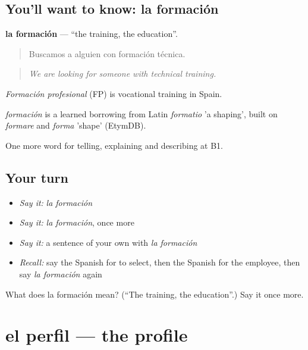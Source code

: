 \subsection*{You'll want to know: la formación}
\textbf{la formación} — \textquotedblleft{}the training, the education\textquotedblright{}.

\begin{quote}
Buscamos a alguien con formación técnica.
\end{quote}

\begin{quote}
\emph{We are looking for someone with technical training.}
\end{quote}

\emph{Formación profesional} (FP) is vocational training in Spain.

\begin{cousinweb}
\emph{formación} is a learned borrowing from Latin \emph{formatio} 'a shaping', built on \emph{formare} and \emph{forma} 'shape' (EtymDB).
\end{cousinweb}

\begin{grammarlens}[title={What you've built}]
One more word for telling, explaining and describing at B1.
\end{grammarlens}

\subsection*{Your turn}
\begin{itemize}
\raggedright
  \item \emph{Say it:} \emph{la formación}
  \item \emph{Say it:} \emph{la formación}, once more
  \item \emph{Say it:} a sentence of your own with \emph{la formación}
  \item \emph{Recall:} say the Spanish for to select, then the Spanish for the employee, then say \emph{la formación} again
\end{itemize}

\begin{tcolorbox}[breakable,colback=teal!4,colframe=teal!35!black,title={Before you move on}]
What does la formación mean? (\textquotedblleft{}The training, the education\textquotedblright{}.) Say it once more.
\end{tcolorbox}
\section[el perfil]{el perfil — the profile}

